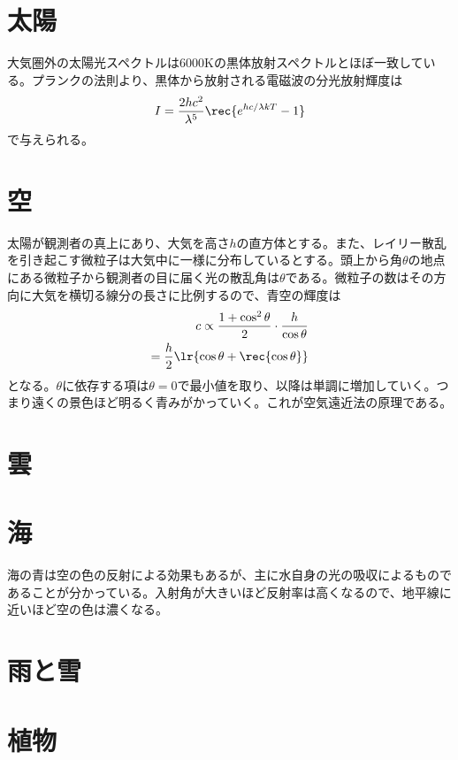 	\section{太陽}
		大気圏外の太陽光スペクトルは6000Kの黒体放射スペクトルとほぼ一致している。プランクの法則より、黒体から放射される電磁波の分光放射輝度は
			\[I = \frac{2hc^2}{\lambda^5}\rec{e^{hc/\lambda kT} - 1}\]
		で与えられる。
	\section{空}
		太陽が観測者の真上にあり、大気を高さ$h$の直方体とする。また、レイリー散乱を引き起こす微粒子は大気中に一様に分布しているとする。頭上から角$\theta$の地点にある微粒子から観測者の目に届く光の散乱角は$\theta$である。微粒子の数はその方向に大気を横切る線分の長さに比例するので、青空の輝度は
		\begin{align*}
			c \propto \frac{1 + \cos^2\theta}{2}\cdot \frac{h}{\cos\theta}\\
			= \frac{h}{2}\lr{\cos\theta + \rec{\cos\theta}}
		\end{align*}
		となる。$\theta$に依存する項は$\theta = 0$で最小値を取り、以降は単調に増加していく。つまり遠くの景色ほど明るく青みがかっていく。これが空気遠近法の原理である。
	\section{雲}
	\section{海}
		海の青は空の色の反射による効果もあるが、主に水自身の光の吸収によるものであることが分かっている。入射角が大きいほど反射率は高くなるので、地平線に近いほど空の色は濃くなる。
	\section{雨と雪}
	\section{植物}